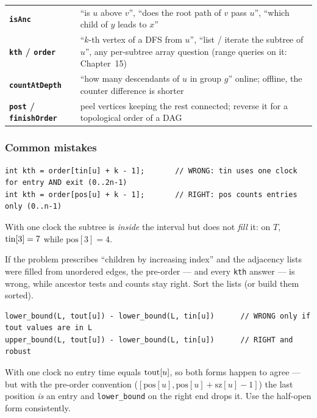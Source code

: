 \begin{insightbox}
\renewcommand{\arraystretch}{1.25}
\begin{tabularx}{\linewidth}{@{}>{\bfseries}l X@{}}
\texttt{isAnc} & ``is $u$ above $v$'', ``does the root path of $v$ pass $u$'', ``which child of $y$ leads to $x$'' \\
\texttt{kth} / \texttt{order} & ``$k$-th vertex of a DFS from $u$'', ``list / iterate the subtree of $u$'', any per-subtree array question (range queries on it: Chapter~15) \\
\texttt{countAtDepth} & ``how many descendants of $u$ in group $g$'' online; offline, the counter difference is shorter \\
\texttt{post} / \texttt{finishOrder} & peel vertices keeping the rest connected; reverse it for a topological order of a DAG \\
\end{tabularx}
\end{insightbox}

\subsubsection*{Common mistakes}

\begin{warningbox}
\begin{lstlisting}[style=snippet]
int kth = order[tin[u] + k - 1];       // WRONG: tin uses one clock for entry AND exit (0..2n-1)
int kth = order[pos[u] + k - 1];       // RIGHT: pos counts entries only (0..n-1)
\end{lstlisting}
With one clock the subtree is \emph{inside} the interval but does not \emph{fill} it: on $T$, $\mathrm{tin}[3] = 7$ while $\mathrm{pos}[3] = 4$.
\end{warningbox}

\begin{warningbox}
If the problem prescribes ``children by increasing index'' and the adjacency lists were filled from unordered edges, the pre-order --- and every \texttt{kth} answer --- is wrong, while ancestor tests and counts stay right. Sort the lists (or build them sorted).
\end{warningbox}

\begin{warningbox}
\begin{lstlisting}[style=snippet]
lower_bound(L, tout[u]) - lower_bound(L, tin[u])      // WRONG only if tout values are in L
upper_bound(L, tout[u]) - lower_bound(L, tin[u])      // RIGHT and robust
\end{lstlisting}
With one clock no entry time equals $\mathrm{tout}[u]$, so both forms happen to agree --- but with the pre-order convention ($[\mathrm{pos}[u], \mathrm{pos}[u]+\mathrm{sz}[u]-1]$) the last position \emph{is} an entry and \texttt{lower\_bound} on the right end drops it. Use the half-open form consistently.
\end{warningbox}

